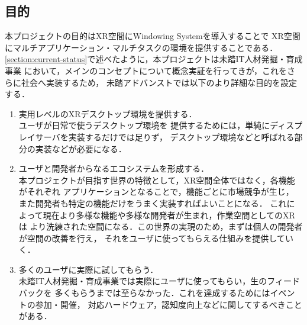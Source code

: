 \subsection{目的}
\label{section:objective}

本プロジェクトの目的はXR空間にWindowing Systemを導入することで
XR空間にマルチアプリケーション・マルチタスクの環境を提供することである．
\ref{section:current-status}で述べたように，本プロジェクトは未踏IT人材発掘・育成事業
において，メインのコンセプトについて概念実証を行ってきが，これをさらに社会へ実装するため，
未踏アドバンストでは以下のより詳細な目的を設定する．

\begin{enumerate}
  \item 実用レベルのXRデスクトップ環境を提供する．\\
        ユーザが日常で使うデスクトップ環境を
        提供するためには，単純にディスプレイサーバを実装するだけでは足りず，
        デスクトップ環境などと呼ばれる部分の実装などが必要になる．
  \item ユーザと開発者からなるエコシステムを形成する．\\ %
        本プロジェクトが目指す世界の特徴として，XR空間全体ではなく，各機能がそれぞれ
        アプリケーションとなることで，機能ごとに市場競争が生じ，
        また開発者も特定の機能だけをうまく実装すればよいことになる．
        これによって現在より多様な機能や多様な開発者が生まれ，作業空間としてのXRは
        より洗練された空間になる．この世界の実現のため，まずは個人の開発者が空間の改善を行え，
        それをユーザに使ってもらえる仕組みを提供していく．
  \item 多くのユーザに実際に試してもらう．\\
        未踏IT人材発掘・育成事業では実際にユーザに使ってもらい，生のフィードバックを
        多くもらうまでは至らなかった．これを達成するためにはイベントの参加・開催，
        対応ハードウェア，認知度向上などに関してするべきことがある．
\end{enumerate}
